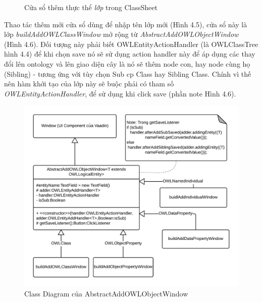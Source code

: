 \begin{figure}[h!]
	\centering
	\caption{Cửa sổ thêm thực thể \textit{lớp} trong ClassSheet \label{overflow}}
\end{figure}
Thao tác thêm mới cửa sổ dùng để nhập tên lớp mới (Hình 4.5), cửa sổ này là lớp \textit{buildAddOWLClassWindow} mở rộng từ \textit{AbstractAddOWLObjectWindow} (Hình 4.6). Đối tượng này phải biết OWLEntityActionHandler (là OWLClassTree hình 4.4) để khi chọn save nó sẽ sử dụng action handler này để áp dụng các thay đổi lên ontology và lên giao diện cây là nó sẽ thêm node con, hay node cùng họ (Sibling) - tương ứng với tùy chọn Sub cp Class hay Sibling Class. Chính vì thế nên hàm khởi tạo của lớp này sẽ buộc phải có tham số \textit{OWLEntityActionHandler}, để sử dụng khi click save (phần note Hình 4.6).
\begin{figure}[h!]
	\centering
	\includegraphics[width=155mm]{Figures/uml_addowlobjectwindow.png}
	\caption{Class Diagram của  AbstractAddOWLObjectWindow\label{overflow}}
\end{figure}
